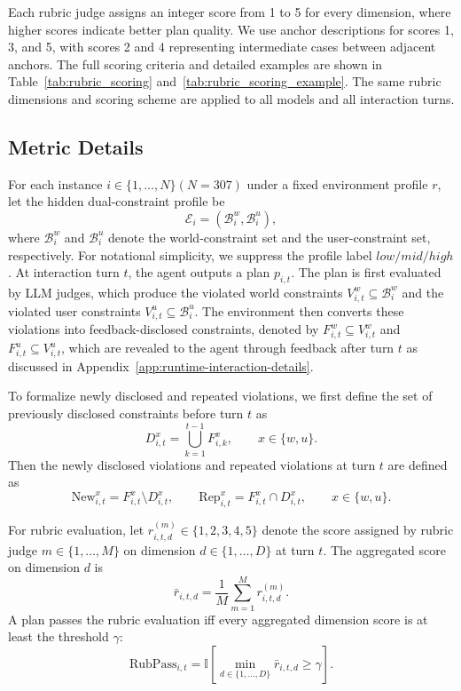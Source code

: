Each rubric judge assigns an integer score from 1 to 5 for every dimension, where higher scores indicate better plan quality. 
We use anchor descriptions for scores 1, 3, and 5, with scores 2 and 4 representing intermediate cases between adjacent anchors. The full scoring criteria and detailed examples are shown in Table~\ref{tab:rubric_scoring} and~\ref{tab:rubric_scoring_example}.
The same rubric dimensions and scoring scheme are applied to all models and all interaction turns.

\subsection{Metric Details}
\label{app:metrics}

For each instance $i \in \{1,\dots,N\} (N=307)$ under a fixed environment profile $r$, let the hidden dual-constraint profile be
\[
\mathcal{E}_i = (\mathcal{B}_i^w, \mathcal{B}_i^u),
\]
where $\mathcal{B}_i^w$ and $\mathcal{B}_i^u$ denote the world-constraint set and the
user-constraint set, respectively. For notational simplicity, we suppress the profile label ${low}/{mid}/{high}$.
At interaction turn $t$, the agent outputs a plan $p_{i,t}$. The plan is first evaluated by LLM judges, which produce the violated world constraints $V_{i,t}^w \subseteq \mathcal{B}_i^w$ and the violated user constraints $V_{i,t}^u \subseteq \mathcal{B}_i^u$.
The environment then converts these violations into feedback-disclosed constraints, denoted by $F_{i,t}^w \subseteq V_{i,t}^w$ and $F_{i,t}^u \subseteq V_{i,t}^u$, 
which are revealed to the agent through feedback after turn $t$ as discussed in Appendix~\ref{app:runtime-interaction-details}.

To formalize newly disclosed and repeated violations, we first define the set of previously
disclosed constraints before turn $t$ as
\begin{equation}
D_{i,t}^x = \bigcup_{k=1}^{t-1} F_{i,k}^x,
\qquad x \in \{w,u\}.
\end{equation}
Then the newly disclosed violations and repeated violations at turn $t$ are defined as
\begin{equation}
\mathrm{New}_{i,t}^x = F_{i,t}^x \setminus D_{i,t}^x,
\qquad
\mathrm{Rep}_{i,t}^x = F_{i,t}^x \cap D_{i,t}^x,
\qquad x \in \{w,u\}.
\end{equation}

For rubric evaluation, let $r_{i,t,d}^{(m)} \in \{1,2,3,4,5\}$ denote the score assigned by
rubric judge $m \in \{1,\dots,M\}$ on dimension $d \in \{1,\dots,D\}$ at turn $t$.
The aggregated score on dimension $d$ is
\begin{equation}
\bar{r}_{i,t,d} = \frac{1}{M}\sum_{m=1}^{M} r_{i,t,d}^{(m)}.
\end{equation}
A plan passes the rubric evaluation iff every aggregated dimension score is at least the
threshold $\gamma$:
\begin{equation}
\mathrm{RubPass}_{i,t}
=
\mathbb{I}\!\left[
\min_{d \in \{1,\dots,D\}} \bar{r}_{i,t,d} \ge \gamma
\right].
\end{equation}

